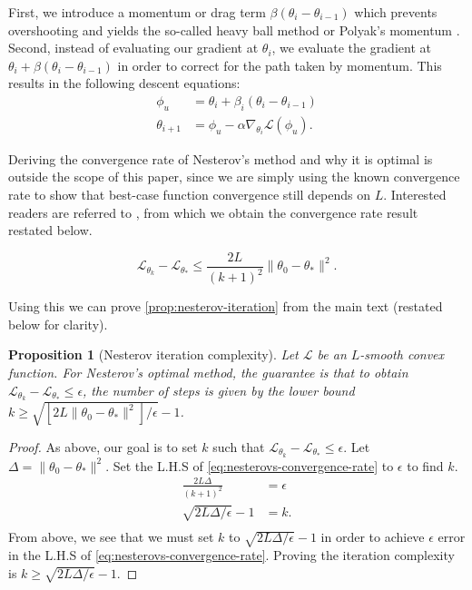 \documentclass{article}
\theoremstyle{plain}
\newtheorem{proposition}[theorem]{Proposition}
\theoremstyle{definition}
\theoremstyle{remark}
\begin{document}
First, we introduce a momentum or drag term $\beta(\theta_i - \theta_{i - 1})$ which prevents overshooting and yields the so-called heavy ball method or Polyak's momentum \citep{polyak1964some}. Second, instead of evaluating our gradient at $\theta_i$, we evaluate the gradient at $\theta_i + \beta(\theta_i - \theta_{i-1})$ in order to correct for the path taken by momentum. This results in the following descent equations:
\begin{align*}
\phi_u &= \theta_i + \beta_i (\theta_i - \theta_{i - 1}) \\
\theta_{i + 1}  &= \phi_u - \alpha \nabla_{\theta_i} \mathcal{L}(\phi_u).
\end{align*}


Deriving the convergence rate of Nesterov's method and why it is optimal is outside the scope of this paper, since we are simply using the known convergence rate to show that best-case function convergence still depends on $L$. Interested readers are referred to \citet{Wright_Recht_2022}, from which we obtain the convergence rate result restated below.

\begin{equation}
\label{eq:nesterovs-convergence-rate}
\mathcal{L}_{\theta_k} - \mathcal{L}_{\theta_*} \leq \frac{
    2L
}{
    (k + 1)^2
} \|\theta_0 - \theta_*\|^2.
\end{equation}

Using this we can prove \cref{prop:nesterov-iteration} from the main text (restated below for clarity).

\begin{proposition}[Nesterov iteration complexity]
\label{prop:nesterov-iteration-app}
Let $\mathcal{L}$ be an $L$-smooth convex function. For Nesterov's optimal method, the guarantee is that to obtain $\mathcal{L}_{\theta_k} - \mathcal{L}_{\theta_*} \le \epsilon$, the number of steps is given by the lower bound \(
 k \ge\sqrt{ \left[ 2L\|\theta_0 - \theta_*\|^2 \right]/\epsilon} - 1  
\).
\end{proposition}

\begin{proof}
As above, our goal is to set $k$ such that \(\mathcal{L}_{\theta_k} - \mathcal{L}_{\theta_*} \leq \epsilon \). Let $\Delta = \|\theta_0 - \theta_*\|^2$. Set the L.H.S of \cref{eq:nesterovs-convergence-rate} to $\epsilon$ to find $k$.
\begin{align*}
\frac{2L\Delta}{(k + 1)^2} &= \epsilon \\
\sqrt{2L\Delta / \epsilon} - 1  &= k. \\
\end{align*}
From above, we see that we must set $k$ to $\sqrt{2L\Delta / \epsilon} - 1$ in order to achieve $\epsilon$ error in the L.H.S of \cref{eq:nesterovs-convergence-rate}. Proving the iteration complexity is $k \geq \sqrt{2L\Delta / \epsilon} - 1$.
\end{proof}
\end{document}
